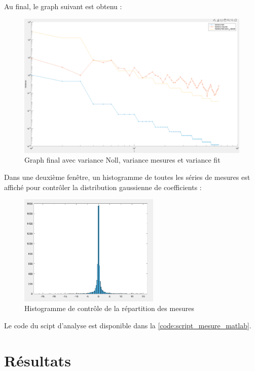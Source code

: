 \newpage
Au final, le graph suivant est obtenu :
\begin{figure}[H]
    \centering
    \includegraphics[width = 1\textwidth]{assets/figures/mesures/Plot_final_avec_fit.png}
    \caption{Graph final avec variance Noll, variance mesures et variance fit}
\end{figure}

Dans une deuxième fenêtre, un histogramme de toutes les séries de mesures est affiché pour contrôler la distribution gaussienne de coefficients :
\begin{figure}[H]
    \centering
    \includegraphics[width = 0.6\textwidth]{assets/figures/mesures/histogramme_mesure.png}
    \caption{Histogramme de contrôle de la répartition des mesures}
\end{figure}

Le code du scipt d'analyse est disponible dans la \autoref{code:script_mesure_matlab}.

\newpage
\section{Résultats}
